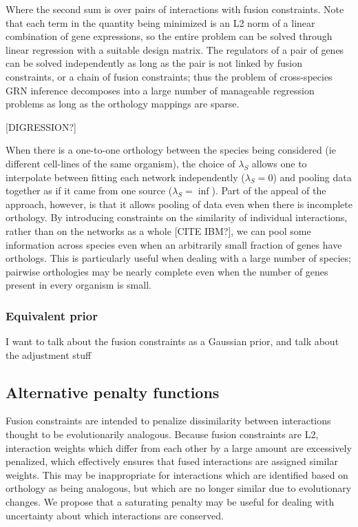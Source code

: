 \documentclass[11pt]{article}
\begin{document}
Where the second sum is over pairs of interactions with fusion constraints. Note that each term in the quantity being minimized is an L2 norm of a linear combination of gene expressions, so the entire problem can be solved through linear regression with a suitable design matrix. The regulators of a pair of genes can be solved independently as long as the pair is not linked by fusion constraints, or a chain of fusion constraints; thus the problem of cross-species GRN inference decomposes into a large number of manageable regression problems as long as the orthology mappings are sparse.

[DIGRESSION?]

When there is a one-to-one orthology between the species being considered (ie different cell-lines of the same organism), the choice of $\lambda_S$ allows one to interpolate between fitting each network independently ($\lambda_S=0$) and pooling data together as if it came from one source ($\lambda_S=\inf$). Part of the appeal of the approach, however, is that it allows pooling of data even when there is incomplete orthology. By introducing constraints on the similarity of individual interactions, rather than on the networks as a whole [CITE IBM?], we can pool some information across species even when an arbitrarily small fraction of genes have orthologs. This is particularly useful when dealing with a large number of species; pairwise orthologies may be nearly complete even when the number of genes present in every organism is small. 
\subsubsection{Equivalent prior}
I want to talk about the fusion constraints as a Gaussian prior, and talk about the adjustment stuff

\subsection{Alternative penalty functions}
Fusion constraints are intended to penalize dissimilarity between interactions thought to be evolutionarily analogous. Because fusion constraints are L2, interaction weights which differ from each other by a large amount are excessively penalized, which effectively ensures that fused interactions are assigned similar weights. This may be inappropriate for interactions which are identified based on orthology as being analogous, but which are no longer similar due to evolutionary changes. We propose that a saturating penalty may be useful for dealing with uncertainty about which interactions are conserved. 
\end{document}
